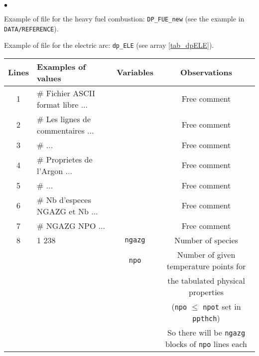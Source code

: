 {{\begin{list}{$\bullet$}{}
       \item Example of file for the heavy fuel combustion: \texttt{DP\_FUE\_new} (see
             the example in \texttt{DATA/REFERENCE}).

       \item Example of file for the electric arc: \texttt{dp\_ELE} (see
             array \ref{tab_dpELE}).

\begin{table}[htbp]
\begin{center}
\small{
\begin{tabular}{|c|l|c|c|} \hline
 Lines  &        Examples of values        & Variables & Observations                                       \\ \hline
  1     &\# Fichier ASCII format libre ... &           & Free comment                                       \\ \hline
  2     &\# Les lignes de commentaires ... &           & Free comment                                       \\ \hline
  3     &\#                            ... &           & Free comment                                       \\ \hline
  4     &\#   Proprietes de l'Argon    ... &           & Free comment                                       \\ \hline
  5     &\#                            ... &           & Free comment                                       \\ \hline
  6     &\# Nb d'especes NGAZG et Nb   ... &           & Free comment                                       \\ \hline
  7     &\# NGAZG NPO                  ... &           & Free comment                                       \\ \hline
  8     &    1   238         &    \texttt{ngazg\index{ngazg}}   & Number of species                         \\
        &                    &    \texttt{npo\index{npo}}       & Number of given temperature points for    \\
        &                    &                         & the tabulated physical properties                  \\
        &                    &                         & (\texttt{npo} $\leqslant$ \texttt{npot} set in \texttt{ppthch})             \\
        &                    &                         & So there will be \texttt{ngazg} blocks of \texttt{npo} lines each    \\ \hline

\end{tabular}}
\end{center}
\end{table}
\end{list}}}
